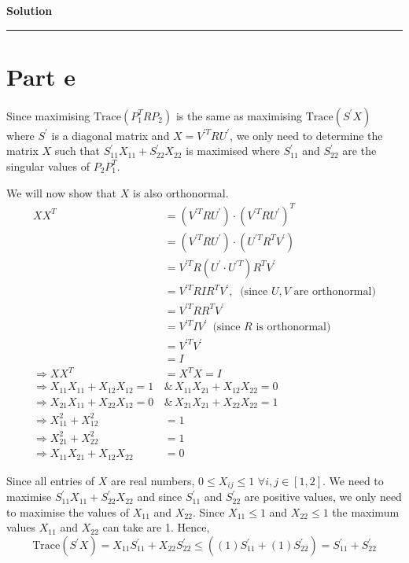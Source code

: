 \documentclass[a4paper,14pt]{article}
\newenvironment{solution}[2][]{%
    \begin{mdframed}[linecolor=blue!70!black, linewidth=2pt, roundcorner=10pt, backgroundcolor=yellow!10!white, skipabove=12pt, skipbelow=12pt]%
        \textbf{\large #2}
        \par\noindent\rule{\textwidth}{0.4pt}
}{
    \end{mdframed}
}
\begin{document}
\begin{solution}{Solution}
    \section{Part e}

    Since maximising $\text{Trace}(P_{1}^{T}RP_{2})$ is the same as maximising $\text{Trace}(S^{'}X)$ where $S^{'}$ is a 
    diagonal matrix and $X = V^{'T} R U^{'}$, we only need to determine the matrix $X$ such that 
    $S^{'}_{11}X_{11} + S^{'}_{22}X_{22}$ is maximised where $S^{'}_{11}$ and $S^{'}_{22}$ are the singular values of 
    $P_{2}P_{1}^{T}$. 

    We will now show that $X$ is also orthonormal.
    \begin{align*}
      X X^{T} &= (V^{'T} R U^{'}) \cdot {(V^{'T} R U^{'})}^{T} \\
              &= (V^{'T} R U^{'}) \cdot (U^{'T} R^{T} V^{'}) \\
              &= V^{'T} R (U^{'} \cdot U^{'T}) R^{T} V^{'} \\
              &= V^{'T} R I R^{T} V^{'} ,\ \text{ (since $U,V$ are orthonormal)}\\
              &= V^{'T} RR^{T} V^{'} \\
              &= V^{'T} I V^{'} \, \text{ (since $R$ is orthonormal)}\\
              &= V^{'T} V^{'} \\
              &= I \\
      \Rightarrow X X^{T} &= X^{T} X = I \\
      \Rightarrow X_{11}X_{11} + X_{12}X_{12} = 1 \, &\text{\&} \, X_{11}X_{21} + X_{12}X_{22} = 0 \\
      \Rightarrow X_{21}X_{11} + X_{22}X_{12} = 0 \, &\text{\&} \, X_{21}X_{21} + X_{22}X_{22} = 1 \\
      \Rightarrow X_{11}^{2} + X_{12}^{2} &= 1  \\
      \Rightarrow X_{21}^{2} + X_{22}^{2} &= 1 \\
      \Rightarrow X_{11}X_{21} + X_{12}X_{22} &= 0
    \end{align*}

    Since all entries of $X$ are real numbers, $0 \leqslant X_{ij} \leqslant 1$ $\forall i,j \in [1,2]$. We need to maximise
    $S^{'}_{11}X_{11} + S^{'}_{22}X_{22}$ and since $S^{'}_{11}$ and $S^{'}_{22}$ are positive values, we only need to maximise
    the values of $X_{11}$ and $X_{22}$. Since $X_{11} \leqslant 1$ and $X_{22} \leqslant 1$ the maximum values $X_{11}$ and 
    $X_{22}$ can take are 1. Hence,
    \[\text{Trace}(S^{'}X) = X_{11}S^{'}_{11} + X_{22}S^{'}_{22} \leqslant ((1)S^{'}_{11} + (1)S^{'}_{22}) =  S^{'}_{11} + S^{'}_{22}\]
 

\end{solution}
\end{document}
